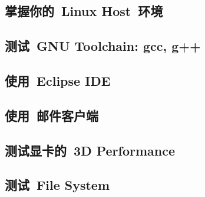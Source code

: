 \documentclass[a4paper,11pt,oneside]{article}
\begin{document}
\begin{CJK*}{UTF8}{gbsn}
\section{掌握你的~Linux Host~环境}
\subsection{测试~GNU Toolchain: gcc, g++}

\subsection{使用~Eclipse IDE}

\subsection{使用~邮件客户端}

\subsection{测试显卡的~3D Performance}

\subsection{测试~File System}

\ifx \inmaxwitbook \undefined
\clearpage
\end{CJK*}
\end{document}
